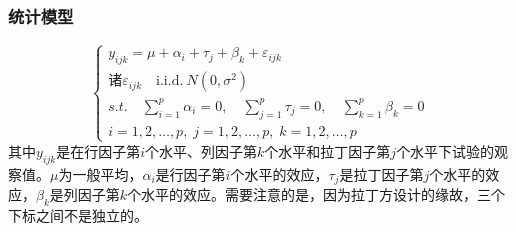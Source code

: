 \subsubsection{统计模型}
\begin{equation*}
	\begin{cases}
		y_{ijk}=\mu+\alpha_i+\tau_j+\beta_k+\varepsilon_{ijk} \\
		\text{诸}\varepsilon_{ijk}\quad\mathrm{i.i.d.~}N(0,\sigma^2) \\
		s.t.\quad\sum\limits_{i=1}^p\alpha_i=0,\quad\sum\limits_{j=1}^p\tau_j=0,\quad\sum\limits_{k=1}^p\beta_k=0 \\
		i=1,2,\dots,p,\;j=1,2,\dots,p,\;k=1,2,\dots,p
	\end{cases}
\end{equation*}
其中$y_{ijk}$是在行因子第$i$个水平、列因子第$k$个水平和拉丁因子第$j$个水平下试验的观察值。$\mu$为一般平均，$\alpha_i$是行因子第$i$个水平的效应，$\tau_j$是拉丁因子第$j$个水平的效应，$\beta_k$是列因子第$k$个水平的效应。需要注意的是，因为拉丁方设计的缘故，三个下标之间不是独立的。
